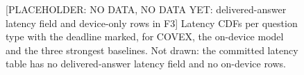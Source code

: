 \documentclass[sigconf]{acmart}
\begin{document}
{\selectfont
\begin{figure}[t]
  \centering
  
  \caption{{[}PLACEHOLDER: NO DATA, NO DATA YET: delivered-answer latency field and device-only rows in F3] Latency CDFs per question type with the deadline marked, for COVEX, the on-device model and the three strongest baselines. Not drawn: the committed latency table has no delivered-answer latency field and no on-device rows.}
  \label{fig:F3_latency_cdf}
\end{figure}
}


\end{document}
